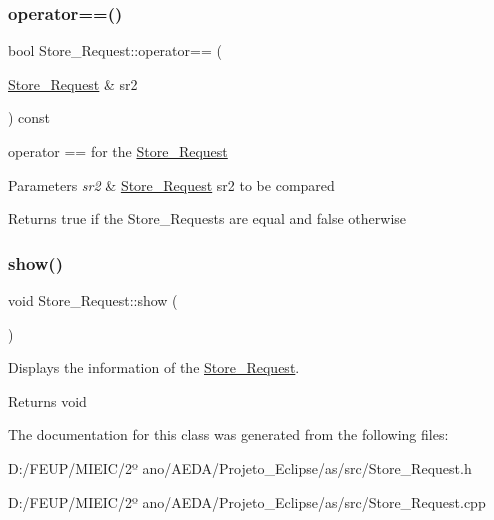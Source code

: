 \subsubsection{\texorpdfstring{operator==()}{operator==()}}
{\footnotesize\ttfamily bool Store\+\_\+\+Request\+::operator== (\begin{DoxyParamCaption}\item[{\hyperlink{class_store___request}{Store\+\_\+\+Request} \&}]{sr2 }\end{DoxyParamCaption}) const}



operator == for the \hyperlink{class_store___request}{Store\+\_\+\+Request} 


\begin{DoxyParams}{Parameters}
{\em sr2} & \hyperlink{class_store___request}{Store\+\_\+\+Request} sr2 to be compared\\
\hline
\end{DoxyParams}
\begin{DoxyReturn}{Returns}
true if the Store\+\_\+\+Requests are equal and false otherwise 
\end{DoxyReturn}
\mbox{\label{class_store___request_a1827180c3d971d1e6a4e6bfc85641019}} 
\subsubsection{\texorpdfstring{show()}{show()}}
{\footnotesize\ttfamily void Store\+\_\+\+Request\+::show (\begin{DoxyParamCaption}{ }\end{DoxyParamCaption})}



Displays the information of the \hyperlink{class_store___request}{Store\+\_\+\+Request}. 

\begin{DoxyReturn}{Returns}
void 
\end{DoxyReturn}


The documentation for this class was generated from the following files\+:\begin{DoxyCompactItemize}
\item 
D\+:/\+F\+E\+U\+P/\+M\+I\+E\+I\+C/2º ano/\+A\+E\+D\+A/\+Projeto\+\_\+\+Eclipse/as/src/Store\+\_\+\+Request.\+h\item 
D\+:/\+F\+E\+U\+P/\+M\+I\+E\+I\+C/2º ano/\+A\+E\+D\+A/\+Projeto\+\_\+\+Eclipse/as/src/Store\+\_\+\+Request.\+cpp\end{DoxyCompactItemize}
